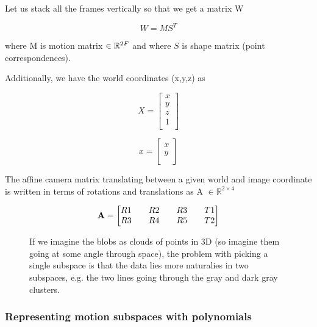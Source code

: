 \documentclass[a4paper]{article}
\begin{document}
Let us stack all the frames vertically so that we get a matrix W

$$W = MS^T$$

where M is motion matrix
$\in \mathbb{R}^{2F \time 4}$
and where $S$ is shape matrix (point correspondences).

Additionally, we have the world coordinates (x,y,z) as

\begin{equation}
X =
\begin{bmatrix}
    x \\
    y \\
    z \\
    1 \\
\end{bmatrix}
\end{equation}


\begin{equation}
x =
\begin{bmatrix}
    x \\
    y \\
\end{bmatrix}
\end{equation}



The affine camera matrix translating between a given world and image coordinate
is written in terms of rotations and translations as A $\in \mathbb{R}^{2 \times 4}$

\begin{equation}
{\bf A} = 
\begin{bmatrix}
    R1 && R2 && R3 && T1 \\
    R3 && R4 && R5 && T2 \\ 
\end{bmatrix}
\end{equation}

 \begin{figure}
     \centering
     \caption{If we imagine the blobs as clouds of points in 3D
     (so imagine them going at some angle through space), the  problem with picking a single subspace
     is that the data lies more naturalies in two subspaces, e.g. the two lines
     going through the gray and dark gray clusters.}
 \end{figure}

\subsubsection{Representing motion subspaces with polynomials}
\end{document}
